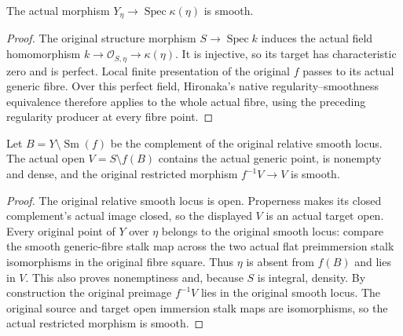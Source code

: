 \begin{lemma}
\label{lem:kn-nadel-bertini-generic-smooth}
\leanok
The actual morphism $Y_\eta\to\operatorname{Spec}\kappa(\eta)$ is smooth.
\end{lemma}
\begin{proof}
The original structure morphism $S\to\operatorname{Spec}k$ induces the actual
field homomorphism $k\to\mathcal O_{S,\eta}\to\kappa(\eta)$.  It is injective,
so its target has characteristic zero and is perfect.  Local finite
presentation of the original $f$ passes to its actual generic fibre.  Over
this perfect field, Hironaka's native regularity--smoothness equivalence
therefore applies to the whole actual fibre, using the preceding regularity
producer at every fibre point.
\end{proof}

\begin{lemma}
\label{lem:kn-nadel-bertini-generic-good-open}
\leanok
Let $B=Y\setminus\operatorname{Sm}(f)$ be the complement of the original
relative smooth locus.  The actual open
$V=S\setminus f(B)$ contains the actual generic point, is nonempty and dense,
and the original restricted morphism $f^{-1}V\to V$ is smooth.
\end{lemma}
\begin{proof}
The original relative smooth locus is open.  Properness makes its closed
complement's actual image closed, so the displayed $V$ is an actual target
open.  Every original point of $Y$ over $\eta$ belongs to the original smooth
locus: compare the smooth generic-fibre stalk map across the two actual flat
preimmersion stalk isomorphisms in the original fibre square.  Thus $\eta$
is absent from $f(B)$ and lies in $V$.  This also proves nonemptiness and,
because $S$ is integral, density.  By construction the original preimage
$f^{-1}V$ lies in the original smooth locus.  The original source and target
open immersion stalk maps are isomorphisms, so the actual restricted
morphism is smooth.
\end{proof}

